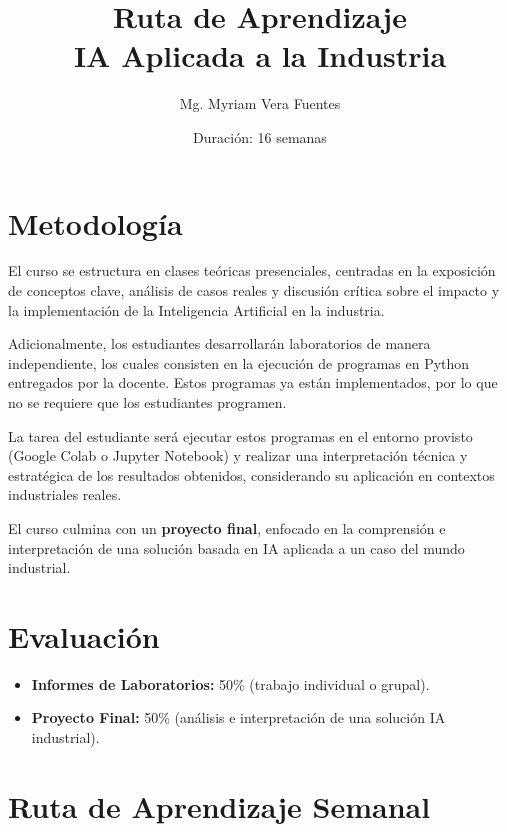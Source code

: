 \documentclass[12pt, a4paper]{article}
\title{\textbf{Ruta de Aprendizaje}\\[0.5em]
       \large IA Aplicada a la Industria}
\author{Mg. Myriam Vera Fuentes}
\date{Duración: 16 semanas}
\begin{document}
\maketitle
\thispagestyle{empty}

\section{Metodología}

El curso se estructura en clases teóricas presenciales, centradas en la exposición de conceptos clave, análisis de casos reales y discusión crítica sobre el impacto y la implementación de la Inteligencia Artificial en la industria.

Adicionalmente, los estudiantes desarrollarán laboratorios de manera independiente, los cuales consisten en la ejecución de programas en Python entregados por la docente. Estos programas ya están implementados, por lo que no se requiere que los estudiantes programen.

La tarea del estudiante será ejecutar estos programas en el entorno provisto (Google Colab o Jupyter Notebook) y realizar una interpretación técnica y estratégica de los resultados obtenidos, considerando su aplicación en contextos industriales reales.

El curso culmina con un \textbf{proyecto final}, enfocado en la comprensión e interpretación de una solución basada en IA aplicada a un caso del mundo industrial.

\section{Evaluación}

\begin{itemize}
    \item \textbf{Informes de Laboratorios:} 50\% \quad (trabajo individual o grupal).
    \item \textbf{Proyecto Final:} 50\% \quad (análisis e interpretación de una solución IA industrial).
\end{itemize}

\section{Ruta de Aprendizaje Semanal}
\end{document}
